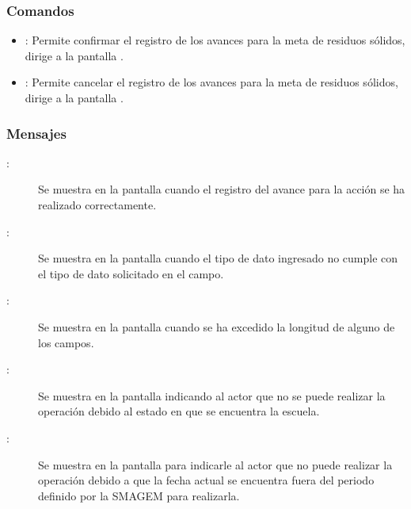 \subsubsection{Comandos}
    \begin{itemize}	
	\item {}: Permite confirmar el registro de los avances para la meta de residuos sólidos, dirige a la pantalla .
	\item {}: Permite cancelar el registro de los avances para la meta de residuos sólidos, dirige a la pantalla .
    \end{itemize}

\subsubsection{Mensajes}

    \begin{description}
    
	    \item [:] Se muestra en la pantalla  cuando el registro del avance para la acción se ha realizado correctamente.
	    
	    \item [:] Se muestra en la pantalla  cuando el tipo de dato ingresado no cumple con el tipo de dato solicitado en el campo.
	    
	    \item [:] Se muestra en la pantalla  cuando se ha excedido la longitud de alguno de los campos.	
	    
	    \item [:] Se muestra en la pantalla  indicando al actor que no se puede realizar la operación debido al estado en que se encuentra la escuela.
	    
	    \item [:] Se muestra en la pantalla  para indicarle al actor que no puede realizar la operación debido a que la fecha actual se encuentra fuera del periodo definido por la SMAGEM para realizarla.
    \end{description}
